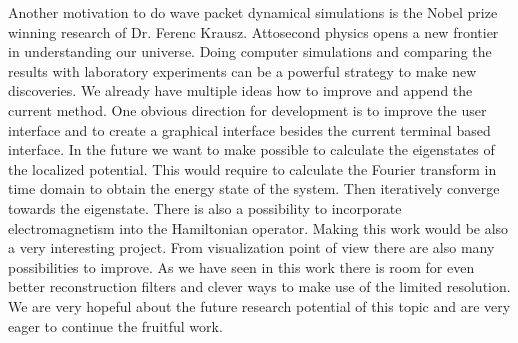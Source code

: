 Another motivation to do wave packet dynamical simulations is the Nobel prize winning research of Dr. Ferenc Krausz. Attosecond physics opens a new frontier in understanding our universe.
Doing computer simulations and comparing the results with laboratory experiments can be a powerful strategy to make new discoveries.
We already have multiple ideas how to improve and append the current method.
One obvious direction for development is to improve the user interface and to create a graphical interface besides the current terminal based interface.
In the future we want to make possible to calculate the eigenstates of the localized potential.
This would require to calculate the Fourier transform in time domain to obtain the energy state of the system.
Then iteratively converge towards the eigenstate.
There is also a possibility to incorporate electromagnetism into the Hamiltonian operator.
Making this work would be also a very interesting project.
From visualization point of view there are also many possibilities to improve.
As we have seen in this work there is room for even better reconstruction filters
and clever ways to make use of the limited resolution.
We are very hopeful about the future research potential of this topic and are very eager to continue the fruitful work.



